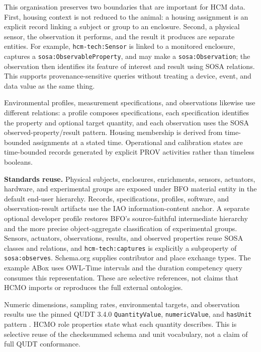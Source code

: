 This organisation preserves two boundaries that are important for HCM data. First, housing context is not reduced to the animal: a housing assignment is an explicit record linking a subject or group to an enclosure. Second, a physical sensor, the observation it performs, and the result it produces are separate entities. For example, \nolinkurl{hcm-tech:Sensor} is linked to a monitored enclosure, captures a \nolinkurl{sosa:ObservableProperty}, and may make a \nolinkurl{sosa:Observation}; the observation then identifies its feature of interest and result using SOSA relations. This supports provenance-sensitive queries without treating a device, event, and data value as the same thing.

Environmental profiles, measurement specifications, and observations likewise use different relations: a profile composes specifications, each specification identifies the property and optional target quantity, and each observation uses the SOSA observed-property/result pattern. Housing membership is derived from time-bounded assignments at a stated time. Operational and calibration states are time-bounded records generated by explicit PROV activities rather than timeless booleans.

\textbf{Standards reuse.} Physical subjects, enclosures, enrichments, sensors, actuators, hardware, and experimental groups are exposed under BFO material entity in the default end-user hierarchy. Records, specifications, profiles, software, and observation-result artifacts use the IAO information-content anchor. A separate optional developer profile restores BFO's source-faithful intermediate hierarchy and the more precise object-aggregate classification of experimental groups. Sensors, actuators, observations, results, and observed properties reuse SOSA classes and relations, and \nolinkurl{hcm-tech:captures} is explicitly a subproperty of \nolinkurl{sosa:observes}. Schema.org supplies contributor and place exchange types. The example ABox uses OWL-Time intervals and the duration competency query consumes this representation. These are selective references, not claims that HCMO imports or reproduces the full external ontologies.

Numeric dimensions, sampling rates, environmental targets, and observation results use the pinned QUDT 3.4.0 \nolinkurl{QuantityValue}, \nolinkurl{numericValue}, and \nolinkurl{hasUnit} pattern \cite{qudt}. HCMO role properties state what each quantity describes. This is selective reuse of the checksummed schema and unit vocabulary, not a claim of full QUDT conformance.

